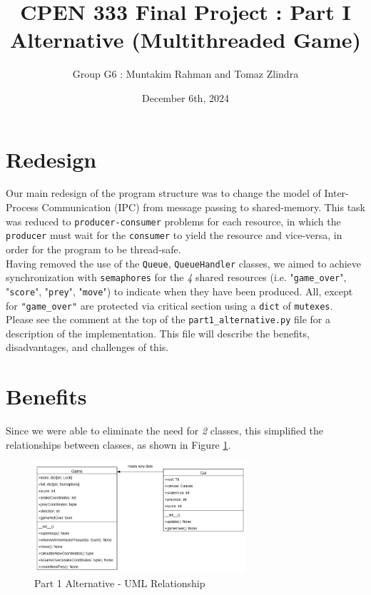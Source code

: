 \documentclass{article}
\title{CPEN 333 Final Project : Part I Alternative (Multithreaded Game)}
\author{Group G6 : Muntakim Rahman and Tomaz Zlindra}
\date{December 6th, 2024}
\begin{document}
\maketitle

\section{Redesign}
Our main redesign of the program structure was to change the model of Inter-Process Communication (IPC) from message passing to shared-memory.
This task was reduced to \texttt{producer-consumer} problems for each resource, in which the \texttt{producer} must wait for the \texttt{consumer} to yield the resource and vice-versa,
in order for the program to be thread-safe. \\

Having removed the use of the \texttt{Queue}, \texttt{QueueHandler} classes, we aimed to achieve synchronization with \texttt{semaphores} for
the \textit{4} shared resources (i.e. "\texttt{game\_over}", "\texttt{score}", "\texttt{prey}", "\texttt{move}") to indicate when they have been produced.
All, except for \texttt{"game\_over"} are protected via critical section using a \texttt{dict} of \texttt{mutexes}. \\

Please see the comment at the top of the \texttt{part1\_alternative.py} file for a description of the implementation. This file will describe the benefits, disadvantages, and challenges of this.

\section{Benefits}

Since we were able to eliminate the need for \textit{2} classes, this simplified the relationships between classes, as shown in Figure \ref{fig:Part1_Alternative_ClassDiagrams}. \\

\begin{figure}[H]
    \centering
    \includegraphics[width=0.7\textwidth]{../Part_1_Alternative_ClassDiagrams.jpg}
    \caption{Part 1 Alternative - UML Relationship}
    \label{fig:Part1_Alternative_ClassDiagrams}
\end{figure}
\end{document}
